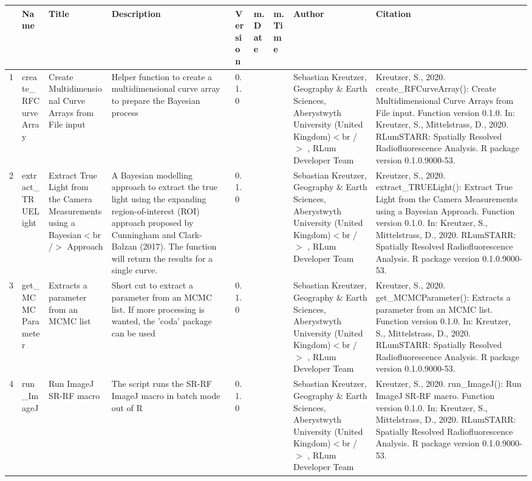 \begin{table}[ht]
\centering
\begin{tabular}{rllllllll}
  \hline
 & Name & Title & Description & Version & m.Date & m.Time & Author & Citation \\ 
  \hline
1 & create\_RFCurveArray & Create Multidimensional Curve Arrays from File input & Helper function to create a multidimensional curve array to prepare the Bayesian process & 0.1.0
 &  &  & Sebastian Kreutzer, Geography \& Earth Sciences, Aberystwyth University (United Kingdom)$<$br /$>$ , RLum Developer Team & Kreutzer, S., 2020. create\_RFCurveArray(): Create Multidimensional Curve Arrays from File input. Function version 0.1.0. In: Kreutzer, S., Mittelstrass, D., 2020. RLumSTARR: Spatially Resolved Radiofluorescence Analysis. R package version 0.1.0.9000-53. 
 \\ 
  2 & extract\_TRUELight & Extract True Light from the Camera Measurements using a Bayesian$<$br /$>$ Approach & A Bayesian modelling approach to extract the true light using the expanding region-of-interest (ROI) approach proposed by Cunningham and Clark-Balzan (2017). The function will return the results for a single curve. & 0.1.0
 &  &  & Sebastian Kreutzer, Geography \& Earth Sciences, Aberystwyth University (United Kingdom)$<$br /$>$ , RLum Developer Team & Kreutzer, S., 2020. extract\_TRUELight(): Extract True Light from the Camera Measurements using a Bayesian Approach. Function version 0.1.0. In: Kreutzer, S., Mittelstrass, D., 2020. RLumSTARR: Spatially Resolved Radiofluorescence Analysis. R package version 0.1.0.9000-53. 
 \\ 
  3 & get\_MCMCParameter & Extracts a parameter from an MCMC list & Short cut to extract a parameter from an MCMC list. If more processing is wanted, the  'coda'  package can be used & 0.1.0
 &  &  & Sebastian Kreutzer, Geography \& Earth Sciences, Aberystwyth University (United Kingdom)$<$br /$>$ , RLum Developer Team & Kreutzer, S., 2020. get\_MCMCParameter(): Extracts a parameter from an MCMC list. Function version 0.1.0. In: Kreutzer, S., Mittelstrass, D., 2020. RLumSTARR: Spatially Resolved Radiofluorescence Analysis. R package version 0.1.0.9000-53. 
 \\ 
  4 & run\_ImageJ & Run ImageJ SR-RF macro & The script runs the SR-RF ImageJ macro in batch mode out of R & 0.1.0
 &  &  & Sebastian Kreutzer, Geography \& Earth Sciences, Aberystwyth University (United Kingdom)$<$br /$>$ , RLum Developer Team & Kreutzer, S., 2020. run\_ImageJ(): Run ImageJ SR-RF macro. Function version 0.1.0. In: Kreutzer, S., Mittelstrass, D., 2020. RLumSTARR: Spatially Resolved Radiofluorescence Analysis. R package version 0.1.0.9000-53. 
 \\ 
   \hline
\end{tabular}
\end{table}


